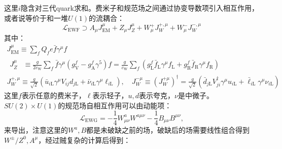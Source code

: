 这里$i$隐含对三代quark求和。费米子和规范场之间通过协变导数项引入相互作用，或者说等价于和一堆$U(1)$的流耦合：
\begin{equation}
	\mathcal{L}_{\mathrm{EWF}}\supset A_{\mu}J_{\mathrm{EM}}^{\mu}+Z_{\mu}J_{Z}^{\mu}+W_{\mu}^{+}J_{W}^{+,\mu}+W_{\mu}^{-}J_{W}^{-,\mu}
\end{equation}
其中：
\begin{equation}
	\begin{gathered}
		J_\mathrm{EM}^\mu\equiv\sum_fQ_fe\bar{f}\gamma^\mu f\\
		\begin{aligned}J_Z^\mu&\equiv\frac g{2c_\mathrm{W}}\sum_f\bar{f}\gamma^\mu(g_\mathrm{V}^f-g_\mathrm{A}^f\gamma^5)f=\frac g{c_\mathrm{W}}\sum_f(g_\mathrm{L}^f\bar{f}_\mathrm{L}\gamma^\mu f_\mathrm{L}+g_\mathrm{R}^f\bar{f}_\mathrm{R}\gamma^\mu f_\mathrm{R})\end{aligned}\\
		J_{W}^{+,\mu}\equiv\frac g{\sqrt{2}}(\bar{u}_{i\mathrm{L}}\gamma^{\mu}V_{ij}d_{j\mathrm{L}}+\bar{\nu}_{i\mathrm{L}}\gamma^{\mu}\ell_{i\mathrm{L}}),\quad J_{W}^{-\mu}\equiv(J_{W}^{+\mu})^{\dagger}=\frac g{\sqrt{2}}(\bar{d}_{j\mathrm{L}}V_{ji}^{\dagger}\gamma^{\mu}u_{i\mathrm{L}}+\bar{\ell}_{i\mathrm{L}}\gamma^{\mu}\nu_{i\mathrm{L}})
	\end{gathered}
\end{equation}
这里$f$表示任意的费米子，$\ell$表示轻子，$u,d$表示夸克，$\nu$是中微子。$SU(2)\times U(1)$的规范场自相互作用可以由动能项：
\begin{equation}
	\mathcal{L}_\mathrm{EWG}=-\frac14W_{\mu\nu}^aW^{a\mu\nu}-\frac14B_{\mu\nu}B^{\mu\nu},
\end{equation}
来导出，注意这里的$W^a,B$都是未破缺之前的场，破缺后的场需要线性组合得到$W^{\pm}/Z^0,A^\mu$，经过贼复杂的计算后得到：
